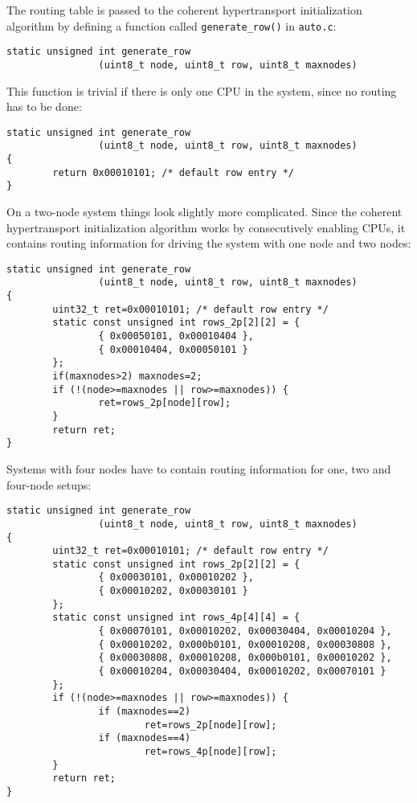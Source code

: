 \documentclass[titlepage,12pt]{article}
\begin{document}
\begin{enumerate}
The routing table is passed to the coherent hypertransport
initialization algorithm by defining a function called
\texttt{generate\_row()} in \texttt{auto.c}:

\begin{verbatim}
static unsigned int generate_row
                (uint8_t node, uint8_t row, uint8_t maxnodes)
\end{verbatim}

This function is trivial if there is only one CPU in the system, since
no routing has to be done:

\begin{verbatim}
static unsigned int generate_row
                (uint8_t node, uint8_t row, uint8_t maxnodes)
{
        return 0x00010101; /* default row entry */
}
\end{verbatim}

On a two-node system things look slightly more complicated. Since the
coherent hypertransport initialization algorithm works by consecutively
enabling CPUs, it contains routing information for driving the system
with one node and two nodes:

\begin{verbatim}
static unsigned int generate_row
                (uint8_t node, uint8_t row, uint8_t maxnodes)
{
        uint32_t ret=0x00010101; /* default row entry */
        static const unsigned int rows_2p[2][2] = {
                { 0x00050101, 0x00010404 },
                { 0x00010404, 0x00050101 }
        };
        if(maxnodes>2) maxnodes=2;
        if (!(node>=maxnodes || row>=maxnodes)) {
                ret=rows_2p[node][row];
        }
        return ret;
}
\end{verbatim}

Systems with four nodes have to contain routing information for one, two
and four-node setups:

\begin{verbatim}
static unsigned int generate_row
                (uint8_t node, uint8_t row, uint8_t maxnodes)
{
        uint32_t ret=0x00010101; /* default row entry */
        static const unsigned int rows_2p[2][2] = {
                { 0x00030101, 0x00010202 },
                { 0x00010202, 0x00030101 }
        };
        static const unsigned int rows_4p[4][4] = {
                { 0x00070101, 0x00010202, 0x00030404, 0x00010204 },
                { 0x00010202, 0x000b0101, 0x00010208, 0x00030808 },
                { 0x00030808, 0x00010208, 0x000b0101, 0x00010202 },
                { 0x00010204, 0x00030404, 0x00010202, 0x00070101 }
        };
        if (!(node>=maxnodes || row>=maxnodes)) {
                if (maxnodes==2)
                        ret=rows_2p[node][row];
                if (maxnodes==4)
                        ret=rows_4p[node][row];
        }
        return ret;
}
\end{verbatim}
\end{enumerate}
\end{document}
